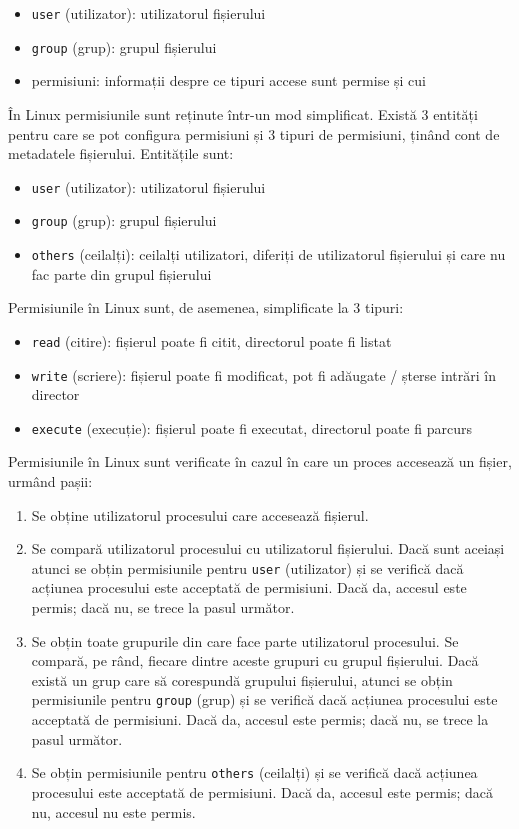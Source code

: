 \begin{itemize}
  \item \texttt{user} (utilizator): utilizatorul fișierului
  \item \texttt{group} (grup): grupul fișierului
  \item permisiuni: informații despre ce tipuri accese sunt permise și cui
\end{itemize}

În Linux permisiunile sunt reținute într-un mod simplificat. Există 3 entități
pentru care se pot configura permisiuni și 3 tipuri de permisiuni, ținând cont
de metadatele fișierului. Entitățile sunt:

\begin{itemize}
  \item \texttt{user} (utilizator): utilizatorul fișierului
  \item \texttt{group} (grup): grupul fișierului
  \item \texttt{others} (ceilalți): ceilalți utilizatori, diferiți de utilizatorul
		fișierului și care nu fac parte din grupul fișierului
\end{itemize}

Permisiunile în Linux sunt, de asemenea, simplificate la 3 tipuri:

\begin{itemize}
  \item \texttt{read} (citire): fișierul poate fi citit, directorul poate fi listat
  \item \texttt{write} (scriere): fișierul poate fi modificat, pot fi adăugate /
		șterse intrări în director
  \item \texttt{execute} (execuție): fișierul poate fi executat, directorul poate
		fi parcurs
\end{itemize}

Permisiunile în Linux sunt verificate în cazul în care un proces accesează un
fișier, urmând pașii:

\begin{enumerate}
	\item Se obține utilizatorul procesului care accesează fișierul.
	\item Se compară utilizatorul procesului cu utilizatorul fișierului.
          Dacă sunt aceiași atunci se obțin permisiunile pentru \texttt{user}
		(utilizator) și se verifică dacă acțiunea procesului este
		acceptată de permisiuni. Dacă da, accesul este permis; dacă nu,
		se trece la pasul următor.
	\item Se obțin toate grupurile din care face parte utilizatorul
		procesului. Se compară, pe rând, fiecare dintre aceste grupuri
		cu grupul fișierului. Dacă există un grup care să corespundă
                grupului fișierului, atunci se obțin permisiunile pentru \texttt{group}
		(grup) și se verifică dacă acțiunea procesului este acceptată de
		permisiuni. Dacă da, accesul este permis; dacă nu, se trece la
		pasul următor.
              \item Se obțin permisiunile pentru \texttt{others} (ceilalți) și se verifică dacă
		acțiunea procesului este acceptată de permisiuni. Dacă da,
		accesul este permis; dacă nu, accesul nu este permis.
\end{enumerate}

